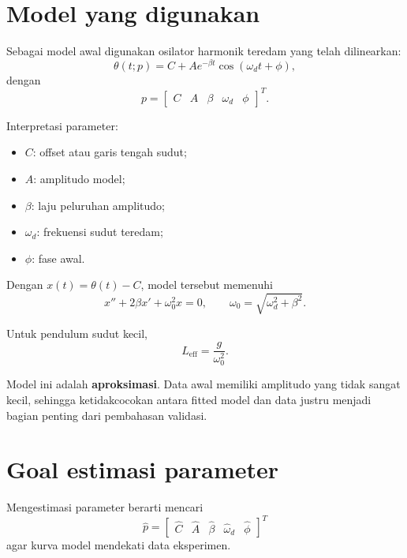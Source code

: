 \documentclass[book,english,noindex,lean,nobackpage,nocopyright,noupdate,nofiglist,notablist]{enacom}
\begin{document}
\section{Model yang digunakan}
Sebagai model awal digunakan osilator harmonik teredam yang telah dilinearkan:
\begin{equation}
\theta(t;p)=C+A e^{-\beta t}\cos(\omega_d t+\phi),
\label{eq:p10-model}
\end{equation}
dengan
\[
p=\begin{bmatrix}C&A&\beta&\omega_d&\phi\end{bmatrix}^{T}.
\]

Interpretasi parameter:
\begin{itemize}
\item $C$: offset atau garis tengah sudut;
\item $A$: amplitudo model;
\item $\beta$: laju peluruhan amplitudo;
\item $\omega_d$: frekuensi sudut teredam;
\item $\phi$: fase awal.
\end{itemize}

Dengan $x(t)=\theta(t)-C$, model tersebut memenuhi
\begin{equation}
x''+2\beta x'+\omega_0^2x=0,
\qquad
\omega_0=\sqrt{\omega_d^2+\beta^2}.
\label{eq:p10-ode}
\end{equation}

Untuk pendulum sudut kecil,
\begin{equation}
L_{\mathrm{eff}}=\frac{g}{\omega_0^2}.
\label{eq:p10-length}
\end{equation}

Model ini adalah \textbf{aproksimasi}. Data awal memiliki amplitudo yang tidak sangat kecil, sehingga ketidakcocokan antara fitted model dan data justru menjadi bagian penting dari pembahasan validasi.

\section{Goal estimasi parameter}
Mengestimasi parameter berarti mencari
\[
\hat p=\begin{bmatrix}\hat C&\hat A&\hat\beta&\hat\omega_d&\hat\phi\end{bmatrix}^{T}
\]
agar kurva model mendekati data eksperimen.
\end{document}
